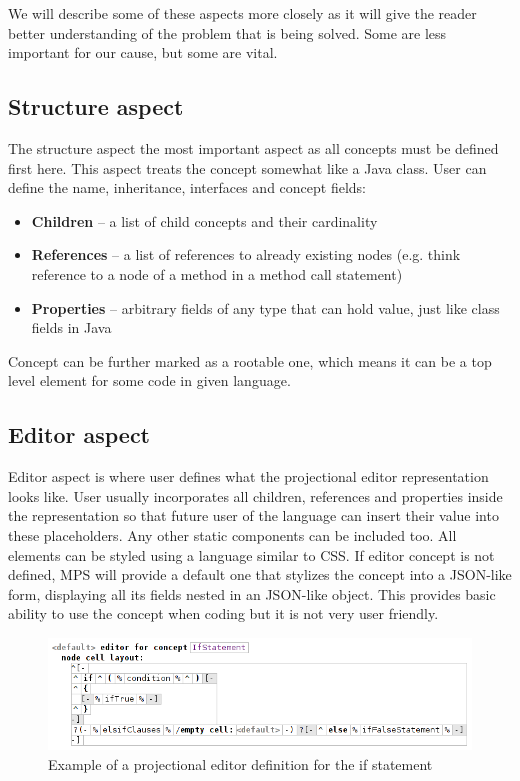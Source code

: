 We will describe some of these aspects more closely as it will give the reader better understanding of the problem that is being solved. Some are less important for our cause, but some are vital.

\subsection{Structure aspect}
The structure aspect the most important aspect as all concepts must be defined first here. This aspect treats the concept somewhat like a Java class. User can define the name, inheritance, interfaces and concept fields:

\begin{itemize}
	\item \textbf{Children} -- a list of child concepts and their cardinality
	
	\item \textbf{References} -- a list of references to already existing nodes (e.g. think reference to a node of a method in a method call statement)
	
	\item \textbf{Properties} -- arbitrary fields of any type that can hold value, just like class fields in Java
\end{itemize}

Concept can be further marked as a rootable one, which means it can be a top level element for some code in given language.

\subsection{Editor aspect}
Editor aspect is where user defines what the projectional editor representation looks like. User usually incorporates all children, references and properties inside the representation so that future user of the language can insert their value into these placeholders. Any other static components can be included too. All elements can be styled using a language similar to CSS. If editor concept is not defined, MPS will provide a default one that stylizes the concept into a JSON-like form, displaying all its fields nested in an JSON-like object. This provides basic ability to use the concept when coding but it is not very user friendly.

\begin{figure}[h]
	\centering
	\includegraphics[width=\textwidth]{../img/if_statement_editor_definition.png}
	\caption{Example of a projectional editor definition for the if statement}
	\label{fig:if_editor_definition}
\end{figure}

